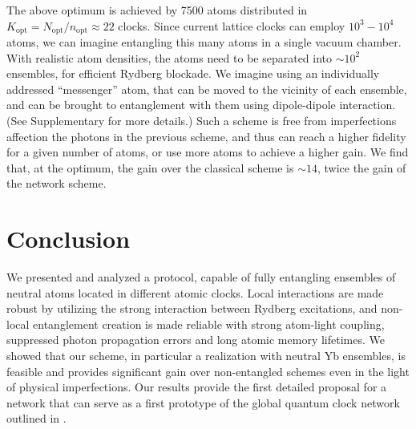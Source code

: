 The above optimum is achieved by 7500 atoms distributed in $K_\mathrm{opt} =
N_\mathrm{opt}/n_\mathrm{opt} \approx 22$ clocks. Since current lattice clocks can
employ $10^3-10^4$ atoms, we can imagine entangling this many atoms in
a single vacuum chamber. With realistic atom densities, the atoms need to be
separated into $\sim 10^2$ ensembles, for efficient Rydberg blockade. We imagine
using an individually addressed ``messenger'' atom, that can be moved to the
vicinity of each ensemble, and can be brought to entanglement with them using
dipole-dipole interaction.
(See Supplementary for more details.) Such a scheme is free from imperfections
affection the photons in the previous scheme, and thus can reach a higher
fidelity for a given number of atoms, or use more atoms to achieve a higher
gain. We find that, at the optimum, the gain over the classical scheme is $\sim
14$, twice the gain of the network scheme.





\section{Conclusion}

We presented and analyzed a protocol, capable of fully entangling ensembles of
neutral atoms located in different atomic clocks. Local interactions are made
robust by utilizing the strong interaction between Rydberg excitations, and
non-local entanglement creation is made reliable with strong atom-light
coupling, suppressed photon propagation errors and long atomic memory lifetimes.
We showed that our scheme, in particular a realization with neutral Yb
ensembles, is feasible and provides significant gain over non-entangled schemes
even in the light of physical imperfections. Our results provide the first
detailed proposal for a network that can serve as a first prototype of the
global quantum clock network outlined in \cite{Komar2014}.
